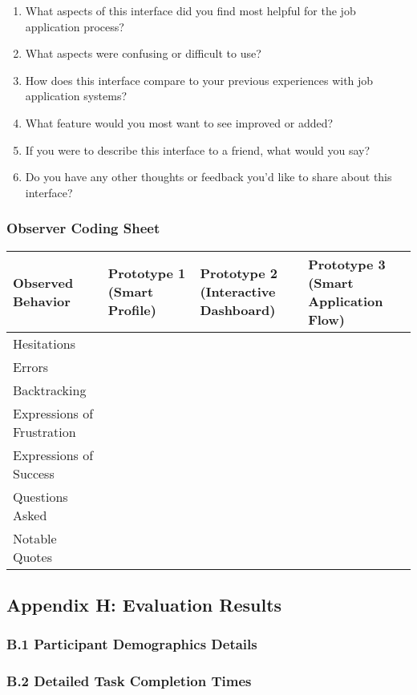\documentclass[
	letterpaper, %
]{jdf}
\begin{document}
\begin{sloppypar}
\begin{enumerate}
    \item What aspects of this interface did you find most helpful for the job application process?
    \item What aspects were confusing or difficult to use?
    \item How does this interface compare to your previous experiences with job application systems?
    \item What feature would you most want to see improved or added?
    \item If you were to describe this interface to a friend, what would you say?
    \item Do you have any other thoughts or feedback you'd like to share about this interface?
\end{enumerate}

\subsubsection{Observer Coding Sheet}

\begin{tabular}{|p{3cm}|p{3cm}|p{3cm}|p{3cm}|}
\hline
\textbf{Observed Behavior} & \textbf{Prototype 1 (Smart Profile)} & \textbf{Prototype 2 (Interactive Dashboard)} & \textbf{Prototype 3 (Smart Application Flow)} \\
\hline
Hesitations & & & \\
\hline
Errors & & & \\
\hline
Backtracking & & & \\
\hline
Expressions of Frustration & & & \\
\hline
Expressions of Success & & & \\
\hline
Questions Asked & & & \\
\hline
Notable Quotes & & & \\
\hline
\end{tabular}

\hfill \break

\subsection{Appendix H: Evaluation Results}
\subsubsection{B.1 Participant Demographics Details}
\subsubsection{B.2 Detailed Task Completion Times}



\end{sloppypar}
\end{document}
